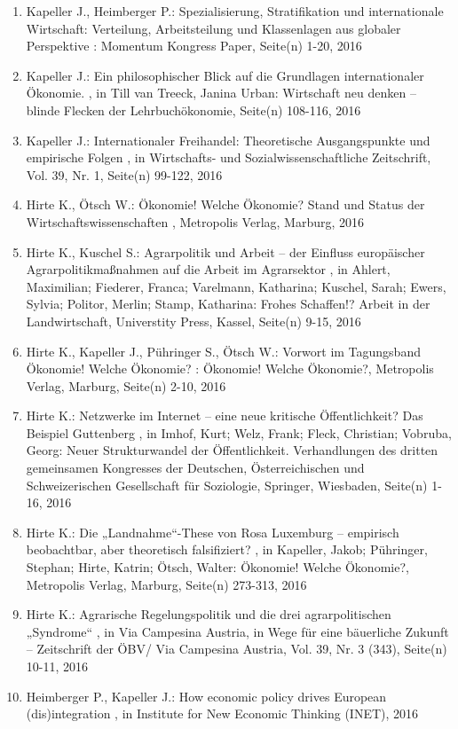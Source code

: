 \begin{enumerate}[leftmargin=*, labelsep=0.5cm]
	 \item Kapeller J., Heimberger P.:  Spezialisierung, Stratifikation und internationale Wirtschaft: Verteilung, Arbeitsteilung und Klassenlagen aus globaler Perspektive  : Momentum Kongress Paper, Seite(n) 1-20, 2016
	 \item Kapeller J.:  Ein philosophischer Blick auf die Grundlagen internationaler Ökonomie.  , in Till van Treeck, Janina Urban: Wirtschaft neu denken – blinde Flecken der Lehrbuchökonomie, Seite(n) 108-116, 2016
	 \item Kapeller J.:  Internationaler Freihandel: Theoretische Ausgangspunkte und empirische Folgen  , in Wirtschafts- und Sozialwissenschaftliche Zeitschrift, Vol. 39, Nr. 1, Seite(n) 99-122, 2016
	 \item Hirte K., Ötsch W.:  Ökonomie! Welche Ökonomie? Stand und Status der Wirtschaftswissenschaften  , Metropolis Verlag, Marburg, 2016
	 \item Hirte K., Kuschel S.:  Agrarpolitik und Arbeit – der Einfluss europäischer Agrarpolitikmaßnahmen auf die Arbeit im Agrarsektor  , in Ahlert, Maximilian; Fiederer, Franca; Varelmann, Katharina; Kuschel, Sarah; Ewers, Sylvia; Politor, Merlin; Stamp, Katharina: Frohes Schaffen!? Arbeit in der Landwirtschaft, Universtity Press, Kassel, Seite(n) 9-15, 2016
	 \item Hirte K., Kapeller J., Pühringer S., Ötsch W.:  Vorwort im Tagungsband Ökonomie! Welche Ökonomie?  : Ökonomie! Welche Ökonomie?, Metropolis Verlag, Marburg, Seite(n) 2-10, 2016
	 \item Hirte K.:  Netzwerke im Internet – eine neue kritische Öffentlichkeit? Das Beispiel Guttenberg  , in Imhof, Kurt; Welz, Frank; Fleck, Christian; Vobruba, Georg: Neuer Strukturwandel der Öffentlichkeit. Verhandlungen des dritten gemeinsamen Kongresses der Deutschen, Österreichischen und Schweizerischen Gesellschaft für Soziologie, Springer, Wiesbaden, Seite(n) 1-16, 2016
	 \item Hirte K.:  Die „Landnahme“-These von Rosa Luxemburg – empirisch beobachtbar, aber theoretisch falsifiziert?  , in Kapeller, Jakob; Pühringer, Stephan; Hirte, Katrin; Ötsch, Walter: Ökonomie! Welche Ökonomie?, Metropolis Verlag, Marburg, Seite(n) 273-313, 2016
	 \item Hirte K.:  Agrarische Regelungspolitik und die drei agrarpolitischen „Syndrome“  , in Via Campesina Austria, in Wege für eine bäuerliche Zukunft – Zeitschrift der ÖBV/ Via Campesina Austria, Vol. 39, Nr. 3 (343), Seite(n) 10-11, 2016
	 \item Heimberger P., Kapeller J.:  How economic policy drives European (dis)integration  , in Institute for New Economic Thinking (INET), 2016

\end{enumerate}
